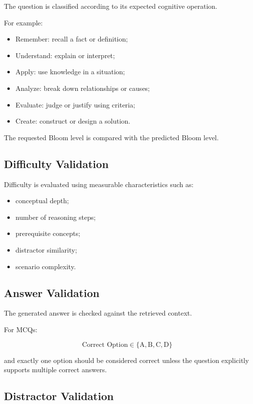 \documentclass[12pt,a4paper]{report}
\begin{document}
The question is classified according to its expected cognitive operation.

For example:

\begin{itemize}
    \item Remember: recall a fact or definition;
    \item Understand: explain or interpret;
    \item Apply: use knowledge in a situation;
    \item Analyze: break down relationships or causes;
    \item Evaluate: judge or justify using criteria;
    \item Create: construct or design a solution.
\end{itemize}

The requested Bloom level is compared with the predicted Bloom level.

\subsection{Difficulty Validation}

Difficulty is evaluated using measurable characteristics such as:

\begin{itemize}
    \item conceptual depth;
    \item number of reasoning steps;
    \item prerequisite concepts;
    \item distractor similarity;
    \item scenario complexity.
\end{itemize}

\subsection{Answer Validation}

The generated answer is checked against the retrieved context.

For MCQs:

\[
\text{Correct Option} \in
\{\text{A},\text{B},\text{C},\text{D}\}
\]

and exactly one option should be considered correct unless the question explicitly supports multiple correct answers.

\subsection{Distractor Validation}
\end{document}

